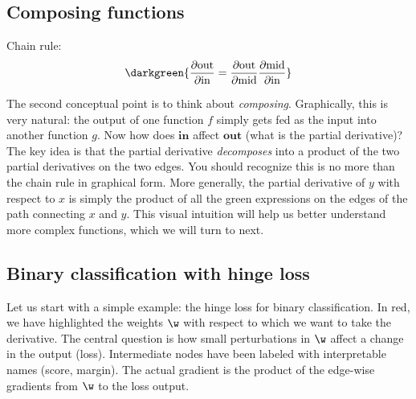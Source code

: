 \subsection{Composing functions}
\begin{marginfigure}
\br

\br

\noindent Chain rule:
\[
	\darkgreen{\frac{\partial \text{out}}{\partial \text{in}} = \frac{\partial \text{out}}{\partial \text{mid}} \frac{\partial \text{mid}}{\partial \text{in}}}
\]
\end{marginfigure}
The second conceptual point is to think about \textit{composing}.
%
Graphically, this is very natural: the output of one function $f$ simply gets fed as the input into another function $g$.
%
Now how does $\textbf{in}$ affect $\textbf{out}$ (what is the partial derivative)?
%
The key idea is that the partial derivative \textit{decomposes} into a product of the two partial derivatives on the two edges.
%
You should recognize this is no more than the chain rule in graphical form.
%
More generally, the partial derivative of $y$ with respect to $x$ is simply the product of all the green expressions on the edges of the path connecting $x$ and $y$.
%
This visual intuition will help us better understand more complex functions, which we will turn to next.



\subsection{Binary classification with hinge loss}
Let us start with a simple example: the hinge loss for binary classification.
%
In red, we have highlighted the weights $\w$ with respect to which we want to take the derivative.
%
The central question is how small perturbations in $\w$ affect a change in the output (loss).
%
Intermediate nodes have been labeled with interpretable names (score, margin).
%
The actual gradient is the product of the edge-wise gradients from $\w$ to the loss output.

